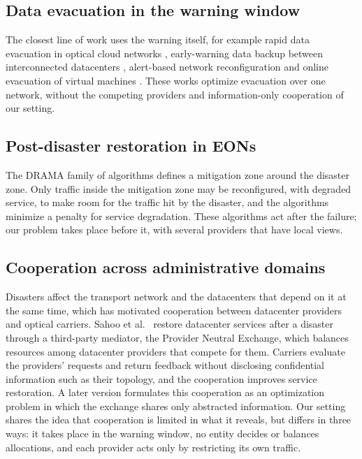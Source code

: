 \documentclass[11pt,a4paper]{article}
\theoremstyle{definition}
\begin{document}
\subsection{Data evacuation in the warning window}

The closest line of work uses the warning itself, for example rapid data evacuation in optical cloud networks \cite{evacuation2015rapid}, early-warning data backup between interconnected datacenters \cite{backup2017earlywarning}, alert-based network reconfiguration \cite{alertbased2020evacuation} and online evacuation of virtual machines \cite{ayoub2021evacuation}.
These works optimize evacuation over one network, without the competing providers and information-only cooperation of our setting.

\subsection{Post-disaster restoration in EONs}

The DRAMA family of algorithms \cite{zou2021drama,zou2022dramaplus,zou2025dramapro} defines a mitigation zone around the disaster zone.
Only traffic inside the mitigation zone may be reconfigured, with degraded service, to make room for the traffic hit by the disaster, and the algorithms minimize a penalty for service degradation.
These algorithms act after the failure; our problem takes place before it, with several providers that have local views.

\subsection{Cooperation across administrative domains}

Disasters affect the transport network and the datacenters that depend on it at the same time, which has motivated cooperation between datacenter providers and optical carriers.
Sahoo et al.\ \cite{sahoo2022cooperation} restore datacenter services after a disaster through a third-party mediator, the Provider Neutral Exchange, which balances resources among datacenter providers that compete for them.
Carriers evaluate the providers' requests and return feedback without disclosing confidential information such as their topology, and the cooperation improves service restoration.
A later version \cite{sahoo2025postdisaster} formulates this cooperation as an optimization problem in which the exchange shares only abstracted information.
Our setting shares the idea that cooperation is limited in what it reveals, but differs in three ways: it takes place in the warning window, no entity decides or balances allocations, and each provider acts only by restricting its own traffic.
\end{document}
